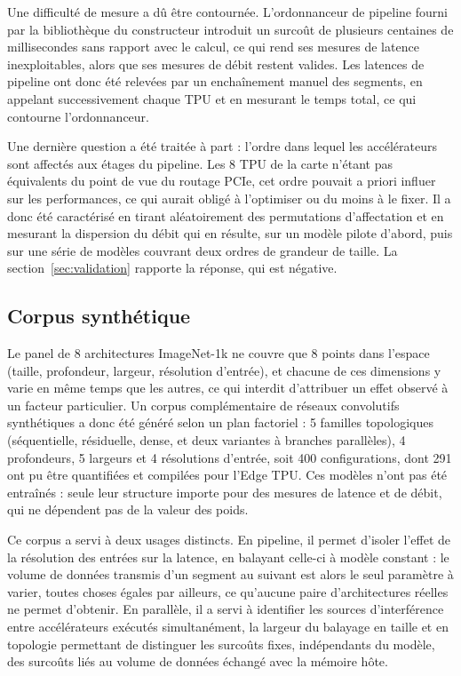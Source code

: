 \documentclass[11pt,a4paper]{report}
\begin{document}
Une difficulté de mesure a dû être contournée. L'ordonnanceur de pipeline fourni par la bibliothèque du constructeur introduit un surcoût de plusieurs centaines de millisecondes sans rapport avec le calcul, ce qui rend ses mesures de latence inexploitables, alors que ses mesures de débit restent valides. Les latences de pipeline ont donc été relevées par un enchaînement manuel des segments, en appelant successivement chaque TPU et en mesurant le temps total, ce qui contourne l'ordonnanceur.

Une dernière question a été traitée à part : l'ordre dans lequel les accélérateurs sont affectés aux étages du pipeline. Les 8 TPU de la carte n'étant pas équivalents du point de vue du routage PCIe, cet ordre pouvait a priori influer sur les performances, ce qui aurait obligé à l'optimiser ou du moins à le fixer. Il a donc été caractérisé en tirant aléatoirement des permutations d'affectation et en mesurant la dispersion du débit qui en résulte, sur un modèle pilote d'abord, puis sur une série de modèles couvrant deux ordres de grandeur de taille. La section~\ref{sec:validation} rapporte la réponse, qui est négative.

\subsection{Corpus synthétique}

Le panel de 8 architectures ImageNet-1k ne couvre que 8 points dans l'espace (taille, profondeur, largeur, résolution d'entrée), et chacune de ces dimensions y varie en même temps que les autres, ce qui interdit d'attribuer un effet observé à un facteur particulier. Un corpus complémentaire de réseaux convolutifs synthétiques a donc été généré selon un plan factoriel : 5 familles topologiques (séquentielle, résiduelle, dense, et deux variantes à branches parallèles), 4 profondeurs, 5 largeurs et 4 résolutions d'entrée, soit 400 configurations, dont 291 ont pu être quantifiées et compilées pour l'Edge TPU. Ces modèles n'ont pas été entraînés : seule leur structure importe pour des mesures de latence et de débit, qui ne dépendent pas de la valeur des poids.

Ce corpus a servi à deux usages distincts. En pipeline, il permet d'isoler l'effet de la résolution des entrées sur la latence, en balayant celle-ci à modèle constant : le volume de données transmis d'un segment au suivant est alors le seul paramètre à varier, toutes choses égales par ailleurs, ce qu'aucune paire d'architectures réelles ne permet d'obtenir. En parallèle, il a servi à identifier les sources d'interférence entre accélérateurs exécutés simultanément, la largeur du balayage en taille et en topologie permettant de distinguer les surcoûts fixes, indépendants du modèle, des surcoûts liés au volume de données échangé avec la mémoire hôte.
\end{document}
